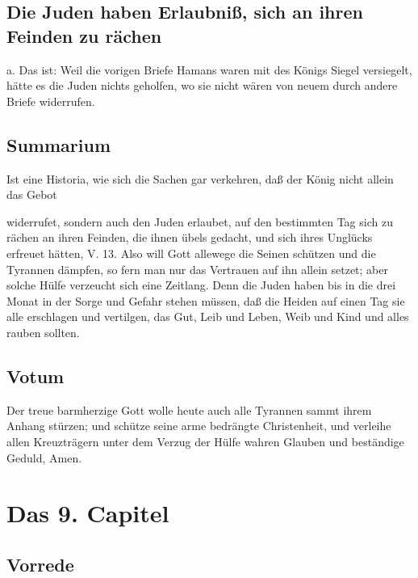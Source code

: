 \section[Die Juden haben Erlaubniß, sich an ihren Feinden]{Die Juden haben Erlaubniß, sich an ihren Feinden zu rächen}

a. Das ist: Weil die vorigen Briefe Hamans waren mit des Königs Siegel versiegelt, hätte es die Juden nichts geholfen, wo sie nicht wären von neuem durch andere Briefe widerrufen.

\section{Summarium}

Ist eine Historia, wie sich die Sachen gar verkehren, daß der König nicht allein das Gebot

widerrufet, sondern auch den Juden erlaubet, auf den bestimmten Tag sich zu rächen an ihren Feinden, die ihnen übels gedacht, und sich ihres Unglücks erfreuet hätten, V. 13. Also will Gott allewege die Seinen schützen und die Tyrannen dämpfen, so fern man nur das Vertrauen auf ihn allein setzet; aber solche Hülfe verzeucht sich eine Zeitlang. Denn die Juden haben bis in die drei Monat in der Sorge und Gefahr stehen müssen, daß die Heiden auf einen Tag sie alle erschlagen und vertilgen, das Gut, Leib und Leben, Weib und Kind und alles rauben sollten.

\section{Votum}

Der treue barmherzige Gott wolle heute auch alle Tyrannen sammt ihrem Anhang stürzen; und schütze seine arme bedrängte Christenheit, und verleihe allen Kreuzträgern unter dem Verzug der Hülfe wahren Glauben und beständige Geduld, Amen.

\chapter{Das 9. Capitel}

\section{Vorrede}

